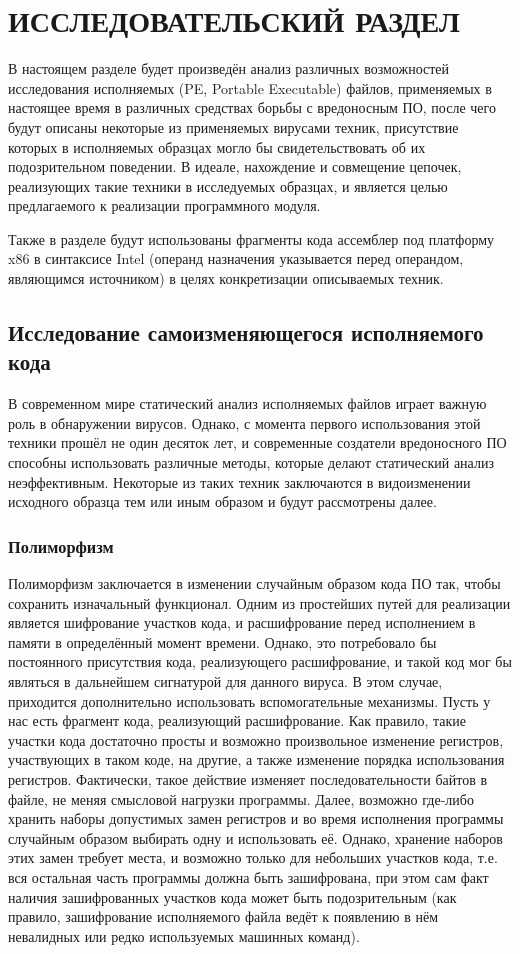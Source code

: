 \section {ИССЛЕДОВАТЕЛЬСКИЙ РАЗДЕЛ}
В настоящем разделе будет произведён анализ различных возможностей исследования исполняемых (PE, Portable Executable) файлов, применяемых в настоящее время в различных средствах борьбы с вредоносным ПО, после чего  будут описаны некоторые из применяемых вирусами техник, присутствие которых в исполняемых образцах могло бы свидетельствовать об их подозрительном поведении. В идеале, нахождение и совмещение цепочек, реализующих такие техники в исследуемых образцах, и является целью предлагаемого к реализации программного модуля.

Также в разделе будут использованы фрагменты кода ассемблер под платформу x86 в синтаксисе Intel (операнд назначения указывается перед операндом, являющимся источником) в целях конкретизации описываемых техник.
\subsection {Исследование самоизменяющегося исполняемого кода}
В современном мире статический анализ исполняемых файлов играет важную роль в обнаружении вирусов. Однако, с момента первого использования этой техники прошёл не один десяток лет, и современные создатели вредоносного ПО способны использовать  различные методы, которые делают статический анализ неэффективным. Некоторые из таких техник заключаются в видоизменении исходного образца тем или иным образом и будут рассмотрены далее. 
\subsubsection {Полиморфизм}
Полиморфизм заключается в изменении случайным образом кода ПО так, чтобы сохранить изначальный функционал. Одним из простейших путей для реализации является шифрование участков кода, и расшифрование перед исполнением в памяти в определённый момент времени. Однако, это потребовало бы постоянного присутствия кода, реализующего расшифрование, и такой код мог бы являться в дальнейшем сигнатурой для данного вируса. В этом случае, приходится дополнительно использовать вспомогательные механизмы. Пусть у нас есть фрагмент кода, реализующий расшифрование. Как правило, такие участки кода достаточно просты и возможно произвольное изменение регистров, участвующих в таком коде, на другие, а также изменение порядка использования регистров. Фактически, такое действие изменяет последовательности байтов в файле, не меняя смысловой нагрузки программы. Далее, возможно где-либо хранить наборы допустимых замен регистров и во время исполнения программы случайным образом выбирать одну и использовать её. Однако, хранение наборов этих замен требует места, и возможно только для небольших участков кода, т.е. вся остальная часть программы должна быть зашифрована, при этом сам факт наличия зашифрованных участков кода может быть подозрительным (как правило, зашифрование исполняемого файла ведёт к появлению в нём невалидных или редко используемых машинных команд).
